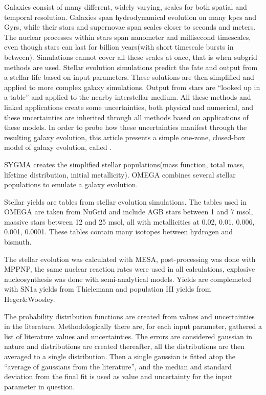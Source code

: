 Galaxies consist of many different, widely varying, scales for both spatial and temporal resolution.
Galaxies span hydrodynamical evolution on many kpcs and Gyrs, while their stars and supernovae span scales closer to seconds and meters.
The nuclear processes within stars span nanometer and millisecond timescales, even though stars can last for billion years(with short timescale bursts in between).
Simulations cannot cover all these scales at once, that is when subgrid methods are used. Stellar evolution simulations predict the fate and output from a stellar life based on input parameters. These solutions are then simplified and applied to more complex galaxy simulations.
Output from stars are ``looked up in a table'' and applied to the nearby interstellar medium.
All these methods and linked applications create some uncertainties, both physical and numerical, and these uncertainties are inherited through all methods based on applications of these models. In order to probe how these uncertainties manifest through the resulting galaxy evolution, this article presents a simple one-zone, closed-box model of galaxy evolution, called \omegamodel.

SYGMA creates the simplified stellar populations(mass function, total mass, lifetime distribution, initial metallicity).
OMEGA combines several stellar populations to emulate a galaxy evolution.

Stellar yields are tables from stellar evolution simulations.
The tables used in OMEGA are taken from NuGrid and include AGB stars between 1 and 7 msol, massive stars between 12 and 25 msol, all with metallicities at 0.02, 0.01, 0.006, 0.001, 0.0001. These tables contain many isotopes between hydrogen and bismuth.

The stellar evolution was calculated with MESA, post-processing was done with MPPNP, the same nuclear reaction rates were used in all calculations, explosive nucleosynthesis was done with semi-analytical models. Yields are complemeted with SN1a yields from Thielemann and population III yields from Heger\&Woosley.

The probability distribution functions are created from values and uncertainties in the literature.
Methodologically there are, for each input parameter, gathered a list of literature values and uncertainties.
The errors are considered gaussian in nature and distributions are created thereafter,
all the distributions are then averaged to a single distribution.
Then a single gaussian is fitted atop the ``average of gaussians from the literature'',
and the median and standard deviation from
the final fit is used as value and uncertainty for the input parameter in question.

